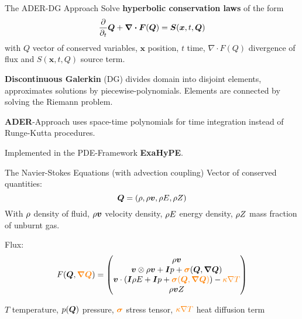 \documentclass[aspectratio=169]{beamer}
\begin{document}
\begin{frame}{The ADER-DG Approach}
  Solve \textbf{hyperbolic conservation laws} of the form
\begin{equation}
  \label{eq:conservation-law}
 \frac{\partial}{\partial_t}  \Q + \divergence{\flux(\Q)} = \source(\bm{x}, t, \Q)
\end{equation}
with $Q$ vector of conserved variables, $\bm{x}$ position, $t$ time,  $\nabla \cdot F(Q)$ divergence of flux and $S(\bm{x}, t, Q)$ source term.

\textbf{Discontinuous Galerkin} (\textsc{DG}) divides domain into disjoint elements, approximates solutions by piecewise-polynomials.
Elements are connected by solving the Riemann problem.

\textbf{ADER}-Approach uses space-time polynomials for time integration instead of Runge-Kutta procedures.

Implemented in the \textsc{PDE}-Framework \textbf{ExaHyPE}.
\end{frame}

\begin{frame}{The Navier-Stokes Equations (with advection coupling)}
  Vector of conserved quantities:
\begin{equation}
  \label{eq:conserved-variables}
 \bm{Q} = \left( \rho, \rho \bm{v}, \rho E, \rho Z \right) 
\end{equation}
With $\rho$ density of fluid, $\rho \bm{v}$ velocity density, $\rho E$ energy density, $\rho Z$ mass fraction of unburnt gas.

Flux:
\begin{equation}
  F(\Q, \textcolor{orange}{\gradQ}) = 
  \begin{pmatrix}
    \Qj \\
    \Qv  \otimes \Qj + \bm{I} \pressure + \textcolor{orange}{\stressT} (\Q, \gradQ)  \\
    \Qv \cdot \left(\bm{I} \QE + \bm{I} \pressure + \textcolor{orange}{\stressT (\Q, \gradQ)} \right) -
    \textcolor{orange}{\kappa \nabla T}\\
    \Qj \QZZ
  \end{pmatrix}
\end{equation}

$T$ temperature, $p(\bm{Q})$ pressure,
$\textcolor{orange}{\bm{\sigma}}$ stress tensor, $\textcolor{orange}{\kappa \nabla T}$ heat diffusion term
\end{frame}
\end{document}
